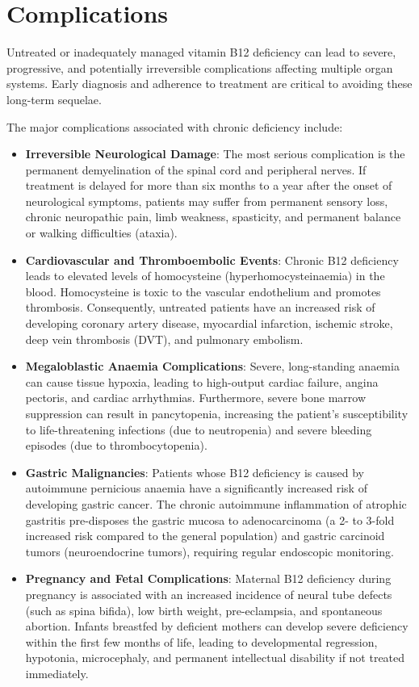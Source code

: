 \section*{Complications}
Untreated or inadequately managed vitamin B12 deficiency can lead to severe, progressive, and potentially irreversible complications affecting multiple organ systems. Early diagnosis and adherence to treatment are critical to avoiding these long-term sequelae.

The major complications associated with chronic deficiency include:
\begin{itemize}
    \item \textbf{Irreversible Neurological Damage}: The most serious complication is the permanent demyelination of the spinal cord and peripheral nerves. If treatment is delayed for more than six months to a year after the onset of neurological symptoms, patients may suffer from permanent sensory loss, chronic neuropathic pain, limb weakness, spasticity, and permanent balance or walking difficulties (ataxia).
    \item \textbf{Cardiovascular and Thromboembolic Events}: Chronic B12 deficiency leads to elevated levels of homocysteine (hyperhomocysteinaemia) in the blood. Homocysteine is toxic to the vascular endothelium and promotes thrombosis. Consequently, untreated patients have an increased risk of developing coronary artery disease, myocardial infarction, ischemic stroke, deep vein thrombosis (DVT), and pulmonary embolism.
    \item \textbf{Megaloblastic Anaemia Complications}: Severe, long-standing anaemia can cause tissue hypoxia, leading to high-output cardiac failure, angina pectoris, and cardiac arrhythmias. Furthermore, severe bone marrow suppression can result in pancytopenia, increasing the patient's susceptibility to life-threatening infections (due to neutropenia) and severe bleeding episodes (due to thrombocytopenia).
    \item \textbf{Gastric Malignancies}: Patients whose B12 deficiency is caused by autoimmune pernicious anaemia have a significantly increased risk of developing gastric cancer. The chronic autoimmune inflammation of atrophic gastritis pre-disposes the gastric mucosa to adenocarcinoma (a 2- to 3-fold increased risk compared to the general population) and gastric carcinoid tumors (neuroendocrine tumors), requiring regular endoscopic monitoring.
    \item \textbf{Pregnancy and Fetal Complications}: Maternal B12 deficiency during pregnancy is associated with an increased incidence of neural tube defects (such as spina bifida), low birth weight, pre-eclampsia, and spontaneous abortion. Infants breastfed by deficient mothers can develop severe deficiency within the first few months of life, leading to developmental regression, hypotonia, microcephaly, and permanent intellectual disability if not treated immediately.
\end{itemize}

